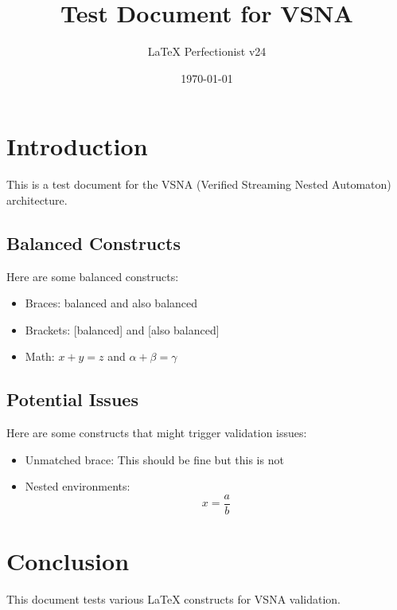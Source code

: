 \documentclass{article}
\begin{document}
\title{Test Document for VSNA}
\author{LaTeX Perfectionist v24}
\date{\today}
\maketitle

\section{Introduction}
This is a test document for the VSNA (Verified Streaming Nested Automaton) architecture.

\subsection{Balanced Constructs}
Here are some balanced constructs:
\begin{itemize}
\item Braces: {balanced} and {also balanced}
\item Brackets: [balanced] and [also balanced]
\item Math: $x + y = z$ and $\alpha + \beta = \gamma$
\end{itemize}

\subsection{Potential Issues}
Here are some constructs that might trigger validation issues:
\begin{itemize}
\item Unmatched brace: This should be fine {but this } is not
\item Nested environments: \begin{equation} x = \frac{a}{b} \end{equation}
\end{itemize}

\section{Conclusion}
This document tests various LaTeX constructs for VSNA validation.
\end{document}
